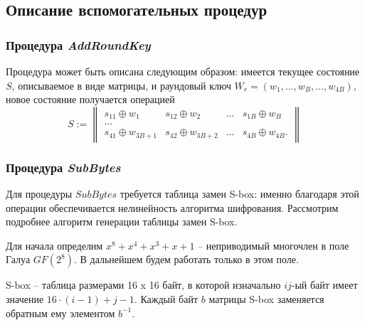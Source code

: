 \subsection{Описание вспомогательных процедур}

\subsubsection{Процедура \textit{AddRoundKey}} \label{AddRoundKey}

    Процедура может быть описана следующим образом: имеется текущее состояние $S$, описываемое в виде матрицы, и
    раундовый ключ $W_{r} = (w_1, \dots, w_{B}, \dots, w_{4B})$, новое состояние получается операцией
    \begin{equation}
        S :=
        \begin{Vmatrix}
            s_{11} \oplus w_1 & s_{12} \oplus w_2 & \dots & s_{1B} \oplus w_B \\
            \dots \\
            s_{41} \oplus w_{3B + 1} & s_{42} \oplus w_{3B + 2} & \dots & s_{4B} \oplus w_{4B}.
        \end{Vmatrix}
    \end{equation}

\subsubsection{Процедура \textit{SubBytes}} \label{SubBytes}

    Для процедуры $SubBytes$ требуется таблица замен S-box: именно благодаря этой операции обеспечивается
    нелинейность алгоритма шифрования. Рассмотрим подробнее алгоритм генерации таблицы замен S-box.

    Для начала определим $x^8 + x^4 + x^3 + x + 1$ -- неприводимый многочлен в поле Галуа $GF(2^8)$.
    В дальнейшем будем работать только в этом поле.

    S-box -- таблица размерами 16 x 16 байт, в которой изначально $ij$-ый байт имеет значение $16 \cdot (i - 1) + j - 1$.
    Каждый байт $b$ матрицы S-box заменяется обратным ему элементом $b^{-1}$.

